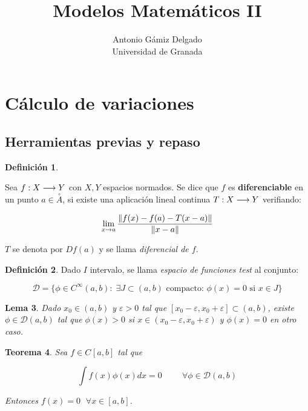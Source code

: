 \documentclass[12pt]{article}
\newtheorem{theorem}{Teorema}
\newtheorem{lemma}[theorem]{Lema}
\theoremstyle{definition}
\newtheorem{definition}[theorem]{Definición}
\theoremstyle{remark}
\newcommand{\continuas}[1][]{C^{ #1 }[a,b]}
\newcommand{\soportecompacto}{\mathcal{D}(a,b)}
\begin{document}
\title{Modelos Matemáticos II}
\author{Antonio Gámiz Delgado\\ Universidad de Granada} 
 
\maketitle

\section{Cálculo de variaciones}

\subsection{Herramientas previas y repaso}

\begin{definition}
\label{funciondiferenciable}

Sea $f : X \longrightarrow Y$ con $X,Y$ espacios normados. Se dice que $f$ es \textbf{diferenciable} en un punto $a\in\overset{\circ}{A}$, si existe una aplicación lineal continua $T : X \longrightarrow Y$ verifiando:

\[
\displaystyle\lim_{ x \to a } \frac{\left\lVert f(x)-f(a)-T(x-a)\right\rVert}{\left\lVert x-a\right\rVert}
\]

$T$ se denota por $Df(a)$ y se llama \textit{diferencial de $f$}.
\end{definition}

\begin{definition}
\label{funcionestest}
Dado $I$ intervalo, se llama \textit{espacio de funciones test} al conjunto:

\[
\mathcal{D} = \{\phi\in C^{\infty}(a,b): \; \exists J\subset(a,b) \text{ compacto: } \phi(x)=0 \text{ si } x \in J\}
\]
\end{definition}

\begin{lemma}
\label{existanciaphi}
Dado $x_0\in(a,b)$ y $\varepsilon>0$ tal que $[x_0-\varepsilon, x_0+\varepsilon]\subset(a,b)$, existe $\phi\in\mathcal{D}(a,b)$ tal que $\phi(x)>0$ si $x\in(x_0-\varepsilon,x_0+\varepsilon)$ y $\phi(x)=0$ en otro caso.
\end{lemma}

\begin{theorem}
\label{theorem:1.3}
Sea $f\in \continuas$ tal que

\[
\int f(x)\phi(x)dx=0 \hspace{1cm} \forall \phi \in \soportecompacto
\]

Entonces $f(x)=0 \;$  $\forall x\in [a,b]$.

\end{theorem}
\end{document}
